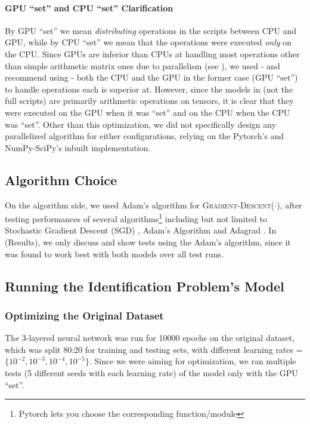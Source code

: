 \paragraph{GPU ``set'' and CPU ``set'' Clarification}  By GPU ``set'' we mean \textit{distributing} operations in the scripts between CPU and GPU, while by CPU ``set'' we mean that the operations were executed \textit{only} on the CPU. Since GPUs are inferior than CPUs at handling most operations other than simple arithmetic matrix ones due to parallelism (see ), we used - and recommend using - both the CPU and the GPU in the former case (GPU ``set'') to handle operations each is superior at. However, since the models in  (not the full scripts) are primarily arithmetic operations on  tensors, it is clear that they were executed on the GPU when it was ``set'' and on the CPU when the CPU was ``set''. Other than this optimization, we did not specifically design any parallelized algorithm for either configurations, relying on the Pytorch's and NumPy-SciPy's inbuilt implementation.

\subsection{Algorithm Choice} \label{sec:Algorithm Choice}
On the algorithm side, we used Adam's algorithm for \textsc{Gradient-Descent}($\cdot$), after testing performances of several algorithms\footnote{Pytorch lets you choose the corresponding function/module} including but not limited to Stochastic Gradient Descent (SGD) \cite{SGD}, Adam's Algorithm \cite{Adam} and Adagrad \cite{Adagrad}. In  (Results), we only discuss and show tests using the Adam's algorithm, since it was found to work best with both models over all test runs.

\subsection{Running the Identification Problem's Model} \label{sec:Running the Identification Problem's Model}
\subsubsection{Optimizing the Original Dataset} \label{sec:Identification Problem-Optimizing the Original Dataset}
The 3-layered neural network was run for 10000 epochs on the original dataset, which was split 80:20 for training and testing sets, with different learning rates = $\{10^{-2}, 10^{-3}, 10^{-4}, 10^{-5}\}$. Since we were aiming for optimization, we ran multiple tests (5 different seeds with each learning rate) of the model only with the GPU ``set''.

